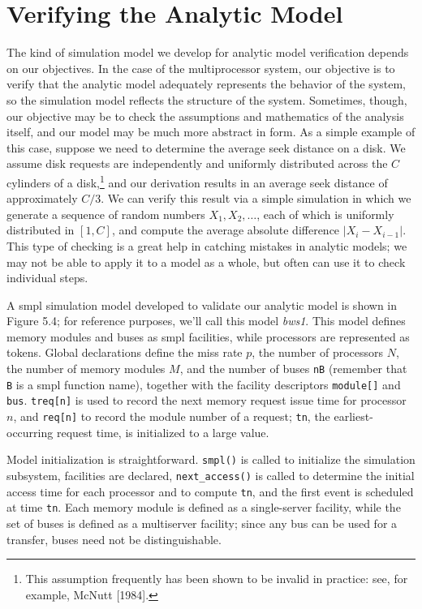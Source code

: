 \section{Verifying the Analytic Model}
\label{sec:mp-verify}

The kind of simulation model we develop for analytic model verification
depends on our objectives. In the case of the multiprocessor system, our
\noindent objective is to verify that the analytic model adequately represents the
behavior of the system, so the simulation model reflects the structure of the
system. Sometimes, though, our objective may be to check the assumptions
and mathematics of the analysis itself, and our model may be much more
abstract in form. As a simple example of this case, suppose we need to determine
the average seek distance on a disk. We assume disk requests are
independently and uniformly distributed across the $C$ cylinders of a disk,\footnote{This assumption frequently has been shown to be invalid in practice: see, for example, McNutt [1984].}
and our derivation results in an average seek distance of approximately $C/3$.
We can verify this result via a simple simulation in which we generate a
sequence of random numbers $X_1, X_2, \ldots$, each of which is uniformly distributed
in $[1,C]$, and compute the average absolute difference $|X_i-X_{i-1}|$. This type
of checking is a great help in catching mistakes in analytic models; we may
not be able to apply it to a model as a whole, but often can use it to check
individual steps.

A smpl simulation model developed to validate our analytic model is
shown in Figure 5.4; for reference purposes, we'll call this model \emph{bws1}. This
model defines memory modules and buses as smpl facilities, while processors
are represented as tokens. Global declarations define the miss rate $p$, the
number of processors $N$, the number of memory modules $M$, and the number of
buses \texttt{nB} (remember that \texttt{B} is a smpl function name), together with the
facility descriptors \texttt{module[]} and \texttt{bus}. \texttt{treq[n]} is used to record the next
memory request issue time for processor $n$, and \texttt{req[n]} to record the module
number of a request; \texttt{tn}, the earliest-occurring request time, is initialized to
a large value.

Model initialization is straightforward. \texttt{smpl()} is called to initialize
the simulation subsystem, facilities are declared, \texttt{next\_access()} is called
to determine the initial access time for each processor and to compute \texttt{tn}, and
the first event is scheduled at time \texttt{tn}. Each memory module is defined as a
single-server facility, while the set of buses is defined as a multiserver
facility; since any bus can be used for a transfer, buses need not be distinguishable.

